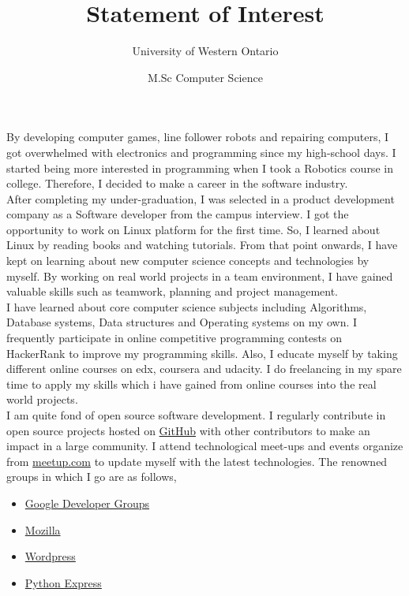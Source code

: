 \documentclass{article}
\title{Statement of Interest}
\author{University of Western Ontario}\date{M.Sc Computer Science}
\begin{document}
  \maketitle %

By developing computer games, line follower robots and repairing computers, I got overwhelmed with electronics and programming since my high-school days. I started being more interested in programming when I took a Robotics course in college. Therefore, I decided to make a career in the software industry.\\

After completing my under-graduation, I was selected in a product development company as a Software developer from the campus interview. I got the opportunity to work on Linux platform for the first time. So, I learned about Linux by reading books and watching tutorials. From that point onwards, I have kept on learning about new computer science concepts and technologies by myself. By working on real world projects in a team environment, I have gained valuable skills such as teamwork, planning and project management.\\

I have learned about core computer science subjects including Algorithms, Database systems, Data structures and Operating systems on my own. I frequently participate in online competitive programming contests on HackerRank to improve my programming skills. Also, I educate myself by taking different online courses on edx, coursera and udacity. I do freelancing in my spare time to apply my skills which i have gained from online courses into the real world projects.\\

I am quite fond of open source software development. I regularly contribute in open source projects hosted on \href{http://www.GitHub.com/mehul-m-prajapati}{GitHub} with other contributors to make an impact in a large community. I attend technological meet-ups and events organize from \href{www.meetup.com}{meetup.com} to update myself with the latest technologies. The renowned groups in which I go are as follows,

\begin{itemize}
   \item \href{https://developers.google.com/groups/chapter/106261089114347152720/}{Google Developer Groups}
   
   \item \href{http://mozillaindia.org/}{Mozilla} 
   
   \item \href{https://www.meetup.com/ahmedabad-wp-meetup/members/72560962/}{Wordpress}
   
   \item \href{https://pythonexpress.in/}{Python Express}
\end{itemize}
\end{document}
